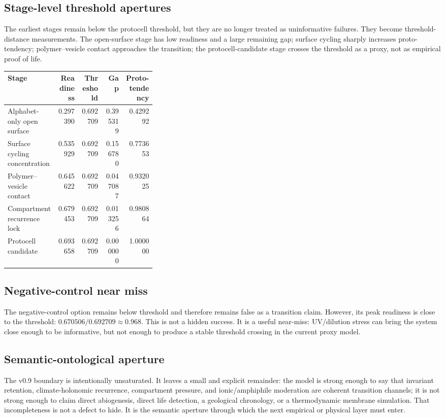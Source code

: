 \documentclass[11pt]{article}
\begin{document}
\subsection{Stage-level threshold apertures}
The earliest stages remain below the protocell threshold, but they are no longer treated as uninformative failures.  They become threshold-distance measurements.  The open-surface stage has low readiness and a large remaining gap; surface cycling sharply increases proto-tendency; polymer--vesicle contact approaches the transition; the protocell-candidate stage crosses the threshold as a proxy, not as empirical proof of life.

\begin{longtable}{p{0.34\linewidth}rrrr}
\toprule
Stage & Readiness & Threshold & Gap & Proto-tendency \\
\midrule
Alphabet-only open surface & 0.297390 & 0.692709 & 0.395319 & 0.429292 \\
Surface cycling concentration & 0.535929 & 0.692709 & 0.156780 & 0.773653 \\
Polymer--vesicle contact & 0.645622 & 0.692709 & 0.047087 & 0.932025 \\
Compartment recurrence lock & 0.679453 & 0.692709 & 0.013256 & 0.980864 \\
Protocell candidate & 0.693658 & 0.692709 & 0.000000 & 1.000000 \\
\bottomrule
\end{longtable}

\subsection{Negative-control near miss}
The negative-control option remains below threshold and therefore remains false as a transition claim.  However, its peak readiness is close to the threshold: $0.670506/0.692709 \approx 0.968$.  This is not a hidden success.  It is a useful near-miss: UV/dilution stress can bring the system close enough to be informative, but not enough to produce a stable threshold crossing in the current proxy model.

\subsection{Semantic-ontological aperture}
The v0.9 boundary is intentionally unsaturated.  It leaves a small and explicit remainder: the model is strong enough to say that invariant retention, climate-holonomic recurrence, compartment pressure, and ionic/amphiphile moderation are coherent transition channels; it is not strong enough to claim direct abiogenesis, direct life detection, a geological chronology, or a thermodynamic membrane simulation.  That incompleteness is not a defect to hide.  It is the semantic aperture through which the next empirical or physical layer must enter.
\end{document}
